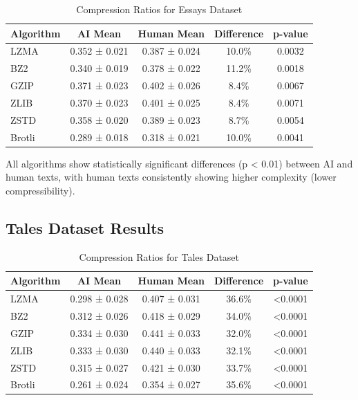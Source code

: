 \documentclass[12pt,a4paper]{report}
\begin{document}
\begin{table}[h]
\centering
\caption{Compression Ratios for Essays Dataset}
\begin{tabular}{lcccc}
\toprule
\textbf{Algorithm} & \textbf{AI Mean} & \textbf{Human Mean} & \textbf{Difference} & \textbf{p-value} \\
\midrule
LZMA & 0.352 ± 0.021 & 0.387 ± 0.024 & 10.0\% & 0.0032 \\
BZ2 & 0.340 ± 0.019 & 0.378 ± 0.022 & 11.2\% & 0.0018 \\
GZIP & 0.371 ± 0.023 & 0.402 ± 0.026 & 8.4\% & 0.0067 \\
ZLIB & 0.370 ± 0.023 & 0.401 ± 0.025 & 8.4\% & 0.0071 \\
ZSTD & 0.358 ± 0.020 & 0.389 ± 0.023 & 8.7\% & 0.0054 \\
Brotli & 0.289 ± 0.018 & 0.318 ± 0.021 & 10.0\% & 0.0041 \\
\bottomrule
\end{tabular}
\end{table}

All algorithms show statistically significant differences (p < 0.01) between AI and human texts, with human texts consistently showing higher complexity (lower compressibility).

\subsection{Tales Dataset Results}

\begin{table}[h]
\centering
\caption{Compression Ratios for Tales Dataset}
\begin{tabular}{lcccc}
\toprule
\textbf{Algorithm} & \textbf{AI Mean} & \textbf{Human Mean} & \textbf{Difference} & \textbf{p-value} \\
\midrule
LZMA & 0.298 ± 0.028 & 0.407 ± 0.031 & 36.6\% & <0.0001 \\
BZ2 & 0.312 ± 0.026 & 0.418 ± 0.029 & 34.0\% & <0.0001 \\
GZIP & 0.334 ± 0.030 & 0.441 ± 0.033 & 32.0\% & <0.0001 \\
ZLIB & 0.333 ± 0.030 & 0.440 ± 0.033 & 32.1\% & <0.0001 \\
ZSTD & 0.315 ± 0.027 & 0.421 ± 0.030 & 33.7\% & <0.0001 \\
Brotli & 0.261 ± 0.024 & 0.354 ± 0.027 & 35.6\% & <0.0001 \\
\bottomrule
\end{tabular}
\end{table}
\end{document}

